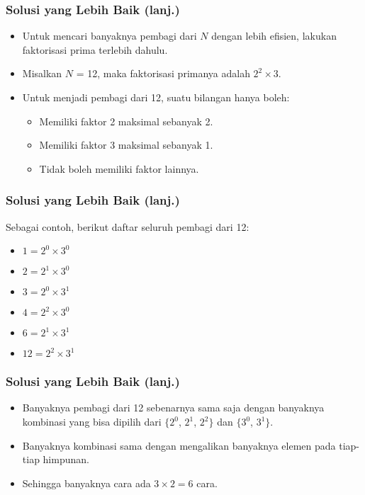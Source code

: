 \begin{frame}
\frametitle{Solusi yang Lebih Baik (lanj.)}
\begin{itemize}
  \item Untuk mencari banyaknya pembagi dari $N$ dengan lebih efisien, lakukan faktorisasi prima terlebih dahulu.
  \item Misalkan $N$ = 12, maka faktorisasi primanya adalah $2^2 \times 3$.
  \newline
  \item Untuk menjadi pembagi dari 12, suatu bilangan hanya boleh:
  \begin{itemize}
    \item Memiliki faktor 2 maksimal sebanyak 2.
    \item Memiliki faktor 3 maksimal sebanyak 1.
    \item Tidak boleh memiliki faktor lainnya.
  \end{itemize}
\end{itemize}
\end{frame}

\begin{frame}
\frametitle{Solusi yang Lebih Baik (lanj.)}
Sebagai contoh, berikut daftar seluruh pembagi dari 12:
\begin{itemize}
  \item $1 = 2^0 \times 3^0$
  \item $2 = 2^1 \times 3^0$
  \item $3 = 2^0 \times 3^1$
  \item $4 = 2^2 \times 3^0$
  \item $6 = 2^1 \times 3^1$
  \item $12 = 2^2 \times 3^1$
\end{itemize}
\end{frame}

\begin{frame}
\frametitle{Solusi yang Lebih Baik (lanj.)}
\begin{itemize}
  \item Banyaknya pembagi dari 12 sebenarnya sama saja dengan banyaknya kombinasi yang bisa dipilih dari $\lbrace 2^0$, $2^1$, $2^2\rbrace $ dan $\lbrace 3^0$, $3^1\rbrace$.
  \item Banyaknya kombinasi sama dengan mengalikan banyaknya elemen pada tiap-tiap himpunan.
  \item Sehingga banyaknya cara ada $3 \times 2 = 6$ cara.
\end{itemize}
\end{frame}

